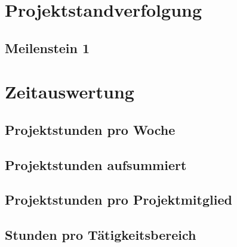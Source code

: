 \section{Projektstandverfolgung}

\subsection{Meilenstein 1}

\section{Zeitauswertung}

\subsection{Projektstunden pro Woche}

\subsection{Projektstunden aufsummiert}

\subsection{Projektstunden pro Projektmitglied}

\subsection{Stunden pro Tätigkeitsbereich}

